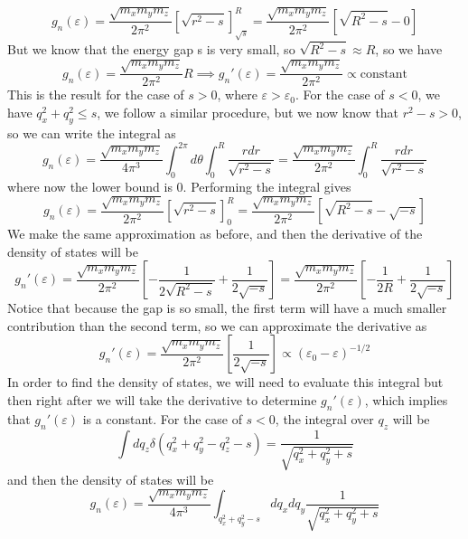 \documentclass[12pt]{article}
\begin{document}
\begin{equation}
    g_n(\varepsilon) = \frac{\sqrt{m_x m_y m_z}}{2 \pi^2}\left[\sqrt{r^2 - s}\right]_{\sqrt{s}}^{R} = \frac{\sqrt{m_x m_y m_z}}{2 \pi^2}\left[\sqrt{R^2 - s} - 0\right]
\end{equation}
But we know that the energy gap s is very small, so $\sqrt{R^2 - s} \approx R$, so we have
\begin{equation}
    g_n(\varepsilon) = \frac{\sqrt{m_x m_y m_z}}{2 \pi^2}R \implies g_n'(\varepsilon) = \frac{\sqrt{m_x m_y m_z}}{2 \pi^2} \propto \text{constant}
\end{equation}
This is the result for the case of $s > 0$, where $\varepsilon > \varepsilon_0$. For the case of $s < 0$, we have $q_x^2 + q_y^2 \leq s$, we follow a similar procedure, but we now know that $r^2 -s > 0$, so we can write the integral as
\begin{equation}
    g_n(\varepsilon) = \frac{\sqrt{m_x m_y m_z}}{4 \pi^3}\int_{0}^{2\pi} d\theta \int_{0}^{R} \frac{r dr}{\sqrt{r^2-s}} = \frac{\sqrt{m_x m_y m_z}}{2 \pi^2}\int_{0}^{R} \frac{rdr}{\sqrt{r^2-s}}
\end{equation}
where now the lower bound is 0. Performing the integral gives
\begin{equation}
    g_n(\varepsilon) = \frac{\sqrt{m_x m_y m_z}}{2 \pi^2}\left[\sqrt{r^2 - s}\right]_{0}^{R} = \frac{\sqrt{m_x m_y m_z}}{2 \pi^2}\left[\sqrt{R^2 - s} - \sqrt{-s}\right]
\end{equation}
We make the same approximation as before, and then the derivative of the density of states will be
\begin{equation}
    g_n'(\varepsilon) = \frac{\sqrt{m_x m_y m_z}}{2 \pi^2}\left[-\frac{1}{2\sqrt{R^2 - s}}+\frac{1}{2\sqrt{-s}}\right] = \frac{\sqrt{m_x m_y m_z}}{2 \pi^2}\left[-\frac{1}{2R}+\frac{1}{2\sqrt{-s}}\right]
\end{equation}
Notice that because the gap is so small, the first term will have a much smaller contribution than the second term, so we can approximate the derivative as
\begin{equation}
    g_n'(\varepsilon) = \frac{\sqrt{m_x m_y m_z}}{2 \pi^2}\left[\frac{1}{2\sqrt{-s}}\right] \propto \left(\varepsilon_0 - \varepsilon\right)^{-1/2}
\end{equation}
In order to find the density of states, we will need to evaluate this integral but then right after we will take the derivative to determine $g_n'(\varepsilon)$, which implies that $g_n'(\varepsilon)$ is a constant. For the case of $s < 0$, the integral over $q_z$ will be
\begin{equation}
    \int dq_z \delta\left(q_x^2 + q_y^2 - q_z^2 -s \right) = \frac{1}{\sqrt{q_x^2 + q_y^2 + s}}
\end{equation}
and then the density of states will be
\begin{equation}
    g_n(\varepsilon) = \frac{\sqrt{m_x m_y m_z}}{4 \pi^3}\int_{q_x^2 + q_y^2 -s} dq_x dq_y \frac{1}{\sqrt{q_x^2 + q_y^2 + s}}
\end{equation}
\end{document}
